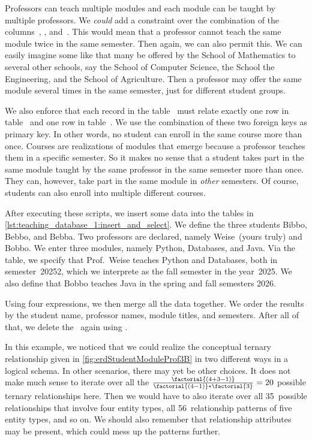 Professors can teach multiple modules and each module can be taught by multiple professors.
We \emph{could} add a  constraint over the combination of the columns~, , and~.
This would mean that a professor cannot teach the same module twice in the same semester.
Then again, we can also permit this.
We can easily imagine some  like  that many be offered by the School of Mathematics to several other schools, say the School of Computer Science, the School the Engineering, and the School of Agriculture.
Then a professor may offer the same module several times in the same semester, just for different student groups.

We also enforce that each record in the table~ must relate exactly one row in table~ and one row in table~.
We use the combination of these two foreign keys as primary key.
In other words, no student can enroll in the same course more than once.
Courses are realizations of modules that emerge because a professor teaches them in a specific semester.
So it makes no sense that a student takes part in the same module taught by the same professor in the same semester more than once.
They can, however, take part in the same module in \emph{other} semesters.
Of course, students can also enroll into multiple different courses.

After executing these scripts, we insert some data into the tables in \cref{lst:teaching_database_1:insert_and_select}.
We define the three students Bibbo, Bebbo, and Bebba.
Two professors are declared, namely Weise~(yours truly) and Bobbo.
We enter three modules, namely Python, Databases, and Java.
Via the  table, we specify that Prof.~Weise teaches Python and Databases, both in semester~20252, which we interprete as the fall semester in the year~2025.
We also define that Bobbo teaches Java in the spring and fall semesters 2026.

Using four  expressions, we then merge all the data together.
We order the results by the student name, professor names, module titles, and semesters.
After all of that, we delete the \db\ again using .

In this example, we noticed that we could realize the conceptual ternary relationship given in \cref{fig:erdStudentModuleProf3B} in two different ways in a logical schema.
In other scenarios, there may yet be other choices.
It does not make much sense to iterate over all the $\frac{\factorial{(4+3-1)}}{\factorial{(4-1)}*\factorial{3}}=20$ possible ternary relationships here.
Then we would have to also iterate over all 35~possible relationships that involve four entity types, all 56~relationship patterns of five entity types, and so on.
We should also remember that relationship attributes may be present, which could mess up the patterns further.

